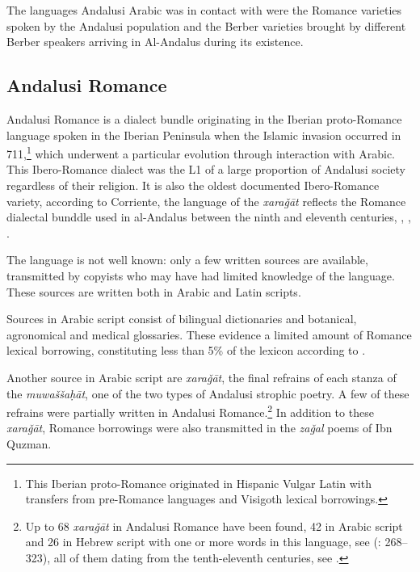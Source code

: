 \documentclass[output=paper,modfonts,nonflat]{langsci/langscibook}
\begin{document}
The languages Andalusi Arabic was in contact with were the Romance varieties spoken by the Andalusi population and the Berber varieties brought by different Berber speakers arriving in Al-Andalus during its existence. 



\subsection{Andalusi Romance}



Andalusi Romance is a dialect bundle originating in the Iberian proto-Romance language spoken in the Iberian Peninsula when the Islamic invasion occurred in 711,\footnote{This Iberian proto-Romance originated in Hispanic Vulgar Latin with transfers from pre-Romance languages and Visigoth lexical borrowings.}  which underwent a particular evolution through interaction with Arabic. This Ibero-Romance dialect was the L1 of a large proportion of Andalusi society regardless of their religion. It is also the oldest documented Ibero-Romance variety, according {to Corriente, the language of the \textit{xaraǧāt} reflects the Romance dialectal bunddle used in al-Andalus between the ninth and eleventh centuries,} {\citep{Corriente1995}}{,} {\citep{Corriente1997a}}{,} {\citep{Corriente2000}}{.} 

The language is not well known: only a few written sources are available, transmitted by copyists who may have had limited knowledge of the language. These sources are written both in Arabic and Latin scripts. 

Sources in Arabic script consist of bilingual dictionaries and botanical, agronomical and medical glossaries. These evidence a limited amount of Romance lexical borrowing, constituting less than 5\% of the lexicon according to \citep[142]{Corriente1992}.

Another source in Arabic script are \textit{xaraǧāt}, the final refrains of each stanza of the \textit{muwaššaḥāt}, one of the two types of Andalusi strophic poetry. A few of these refrains were partially written in Andalusi Romance.\footnote{Up to 68 \textit{xaraǧāt} in Andalusi Romance have been found, 42 in Arabic script and 26 in Hebrew script with one or more words in this language, see (\citealt{Corriente1997a}: 268–323), all of them dating from the tenth-eleventh centuries, see \citep[343]{Corriente1997a}.} In addition to these \textit{xaraǧāt}, Romance borrowings were also transmitted in the \textit{zaǧal} poems of Ibn Quzman. 
\end{document}
